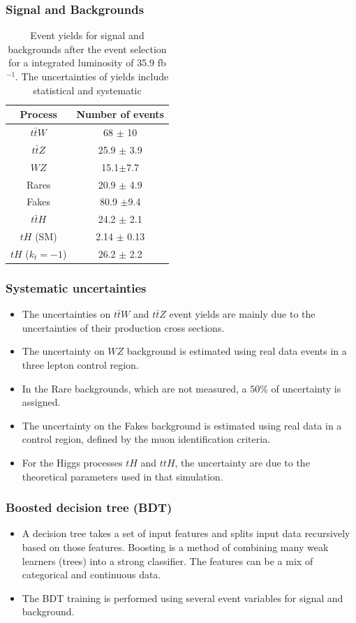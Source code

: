\documentclass[11pt]{beamer}
\begin{document}
\begin{frame}
\frametitle{Signal and Backgrounds}
\begin{table}
	\centering
	\caption*{{Event yields for signal and backgrounds after the event selection for a integrated luminosity of 35.9 fb$^{-1}$.
			The uncertainties of yields include statistical and systematic \cite{2}}} 
	\begin{tabular}{cc}
		\hline
		Process & Number of events \\
		\hline
		$t\bar{t}W$ & 68 $\pm$ 10 \\
		$t\bar{t}Z$ & 25.9 $\pm$ 3.9\\
		$WZ$ & 15.1$\pm$7.7\\
		Rares & 20.9 $\pm$ 4.9\\
		Fakes & 80.9 $\pm$9.4\\
		$t\bar{t}H$ & 24.2 $\pm$ 2.1 \\
		\hline
		$tH$ (SM) & 2.14 $\pm$ 0.13\\
		$tH$ ($k_t=-1$) &26.2 $\pm$ 2.2
	\end{tabular}	
	\label{tth-table}
\end{table}
\end{frame}

\begin{frame}
\frametitle{Systematic uncertainties}
\begin{itemize}
	\item The uncertainties on $t\bar{t}W$ and $t\bar{t}Z$ event yields are mainly due to the uncertainties of their production cross sections. 
	\item The uncertainty on $WZ$ background is estimated using real data events in a three lepton control region. 
	\item In the Rare backgrounds, which are not measured, a $50\%$ of uncertainty is assigned.
	\item The uncertainty on the Fakes background is estimated using real data in a control region, defined by the muon identification criteria. 
	\item For the Higgs processes $tH$ and $ttH$, the uncertainty are due to the theoretical parameters used in that simulation.
\end{itemize}

\end{frame}
\begin{frame}
\frametitle{Boosted decision tree (BDT)}
\begin{itemize}
\item A decision tree takes a set of input features and splits input data recursively based on
those features.
Boosting is a method of combining many weak learners (trees) into a strong classifier. The features can be a mix of categorical and continuous data.
\item The BDT training is performed using several event variables for signal and background. 
\end{itemize}
\end{frame}
\end{document}
